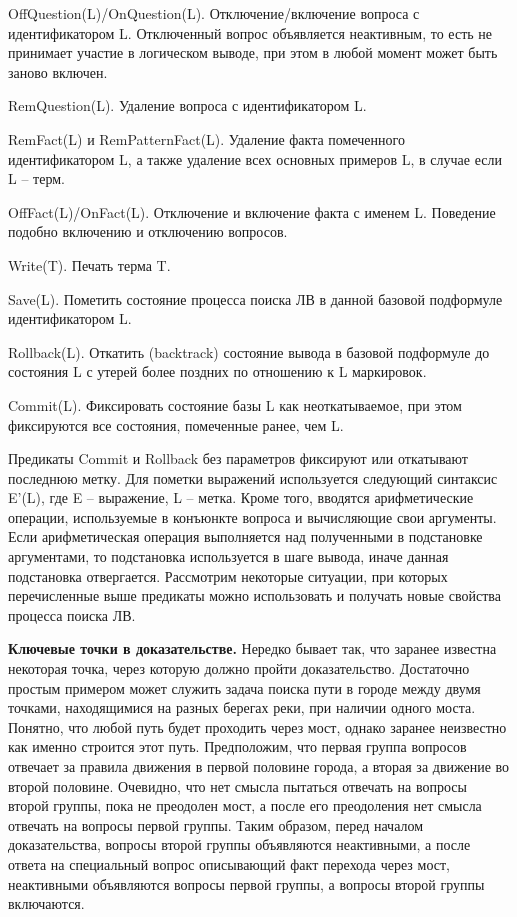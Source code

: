 OffQuestion(L)/OnQuestion(L). Отключение/включение вопроса с идентификатором L. Отключенный вопрос объявляется неактивным, то есть не принимает участие в логическом выводе, при этом в любой момент может быть заново включен.

RemQuestion(L). Удаление вопроса с идентификатором L.

RemFact(L) и RemPatternFact(L). Удаление факта помеченного идентификатором L, а также удаление всех основных примеров L, в случае если L – терм.

OffFact(L)/OnFact(L). Отключение и включение факта с именем L. Поведение подобно включению и отключению вопросов.

Write(T). Печать терма T.

Save(L). Пометить состояние процесса поиска ЛВ в данной базовой подформуле идентификатором L.

Rollback(L). Откатить (backtrack) состояние вывода в базовой подформуле до состояния L с утерей более поздних по отношению к L маркировок.

Commit(L). Фиксировать состояние базы L как неоткатываемое, при этом фиксируются все состояния, помеченные ранее, чем L.

Предикаты Commit и Rollback без параметров фиксируют или откатывают последнюю метку.
Для пометки выражений используется следующий синтаксис E’(L), где E – выражение, L – метка.
Кроме того, вводятся арифметические операции, используемые в конъюнкте вопроса и вычисляющие свои аргументы. Если арифметическая операция выполняется над полученными в подстановке аргументами, то подстановка используется в шаге вывода, иначе данная подстановка отвергается.
Рассмотрим некоторые ситуации, при которых перечисленные выше предикаты можно использовать и получать новые свойства процесса поиска ЛВ.

\textbf{Ключевые точки в доказательстве.} Нередко бывает так, что заранее известна некоторая точка, через которую должно пройти доказательство. Достаточно простым примером может служить задача поиска пути в городе между двумя точками, находящимися на разных берегах реки, при наличии одного моста. Понятно, что любой путь будет проходить через мост, однако заранее неизвестно как именно строится этот путь. Предположим, что первая группа вопросов отвечает за правила движения в первой половине города, а вторая за движение во второй половине. Очевидно, что нет смысла пытаться отвечать на вопросы второй группы, пока не преодолен мост, а после его преодоления нет смысла отвечать на вопросы первой группы. Таким образом, перед началом доказательства, вопросы второй группы объявляются неактивными, а после ответа на специальный вопрос описывающий факт перехода через мост, неактивными объявляются вопросы первой группы, а вопросы второй группы включаются.

